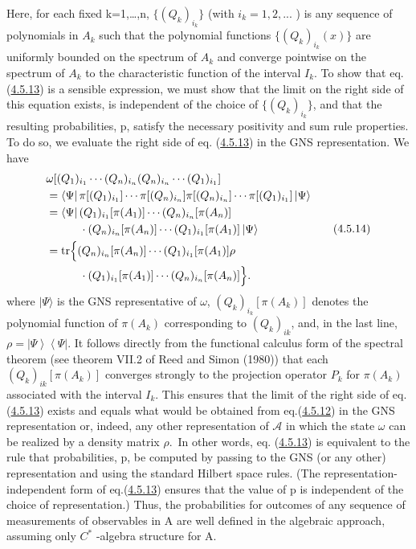 \documentclass[11pt,a4paper]{article}
\providecommand{\ket}[1]{\left\lvert#1\right\rangle}
\providecommand{\bra}[1]{\left\langle#1\right\rvert}
\begin{document}
\hypertarget{source-93}{}

Here, for each fixed k=1,\ldots,n, \(\{(Q_k)_{i_k}\}\) (with \(i_k=1,2,...\) ) is any sequence of polynomials in \(A_k\) such that the polynomial functions \(\{(Q_k)_{i_k}(x)\}\) are uniformly bounded on the spectrum of \(A_k\) and converge pointwise on the spectrum of \(A_k\) to the characteristic function of the interval \(I_k\). To show that eq. (\hyperref[eq:4.5.13]{4.5.13}) is a sensible expression, we must show that the limit on the right side of this equation exists, is independent of the choice of \(\{(Q_k)_{i_k}\}\), and that the resulting probabilities, p, satisfy the necessary positivity and sum rule properties. To do so, we evaluate the right side of eq. (\hyperref[eq:4.5.13]{4.5.13}) in the GNS representation. We have
\begin{equation*}
\begin{aligned}
&\omega[(Q_1)_{i_1}\cdots(Q_n)_{i_n}(Q_n)_{i_n}\cdots(Q_1)_{i_1}]\\
&=\bra\Psi\pi[(Q_1)_{i_1}]\cdots\pi[(Q_n)_{i_n}]
 \pi[(Q_n)_{i_n}]\cdots\pi[(Q_1)_{i_1}]\ket\Psi\\
&=\bra\Psi(Q_1)_{i_1}[\pi(A_1)]\cdots(Q_n)_{i_n}[\pi(A_n)]\\
&\qquad\quad\cdot(Q_n)_{i_n}[\pi(A_n)]\cdots(Q_1)_{i_1}[\pi(A_1)]\ket\Psi\\
&=\operatorname{tr}\Bigl\{(Q_n)_{i_n}[\pi(A_n)]\cdots(Q_1)_{i_1}[\pi(A_1)]\rho\\
&\qquad\quad\cdot(Q_1)_{i_1}[\pi(A_1)]\cdots(Q_n)_{i_n}[\pi(A_n)]\Bigr\}.
\end{aligned} \tag{4.5.14}\label{eq:4.5.14}
\end{equation*}
where \(\lvert \Psi\rangle\) is the GNS representative of \(\omega\), \((Q_k)_{i_k}[\pi(A_k)]\) denotes the polynomial function of \(\pi(A_k)\) corresponding to \((Q_k)_{ik}\), and, in the last line, \(\rho=\ket\Psi\bra\Psi\). It follows directly from the functional calculus form of the spectral theorem (see theorem VII.2 of Reed and Simon (1980)) that each \((Q_k)_{ik}[\pi(A_k)]\) converges strongly to the projection operator \(P_k\) for \(\pi(A_k)\) associated with the interval \(I_k\). This ensures that the limit of the right side of eq. (\hyperref[eq:4.5.13]{4.5.13}) exists and equals what would be obtained from eq.(\hyperref[eq:4.5.12]{4.5.12}) in the GNS representation or, indeed, any other representation of \({\mathcal{A}}\) in which the state \({\omega}\) can be realized by a density matrix \(\rho\).~In other words, eq. (\hyperref[eq:4.5.13]{4.5.13}) is equivalent to the rule that probabilities, p, be computed by passing to the GNS (or any other) representation and using the standard Hilbert space rules. (The representation-independent form of eq.(\hyperref[eq:4.5.13]{4.5.13}) ensures that the value of p is independent of the choice of representation.) Thus, the probabilities for outcomes of any sequence of measurements of observables in A are well defined in the algebraic approach, assuming only \(C^*\) -algebra structure for A.
\end{document}
